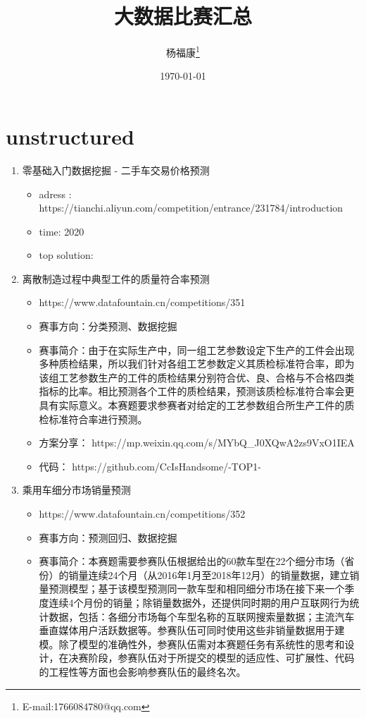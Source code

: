 \documentclass{article}
\title{大数据比赛汇总}
\author{杨福康\thanks{E-mail:1766084780@qq.com}}
\date{\today}
\begin{document}
	\maketitle
	\section{unstructured}
		\begin{enumerate}
			\item 零基础入门数据挖掘 - 二手车交易价格预测
				\begin{itemize}
					\item adress : https://tianchi.aliyun.com/competition/entrance/231784/introduction
					\item time: 2020
					\item top solution:
				\end{itemize} 
			\item 离散制造过程中典型工件的质量符合率预测
				\begin{itemize}
					\item https://www.datafountain.cn/competitions/351
					\item 赛事方向：分类预测、数据挖掘
					
					\item 	赛事简介：由于在实际生产中，同一组工艺参数设定下生产的工件会出现多种质检结果，所以我们针对各组工艺参数定义其质检标准符合率，即为该组工艺参数生产的工件的质检结果分别符合优、良、合格与不合格四类指标的比率。相比预测各个工件的质检结果，预测该质检标准符合率会更具有实际意义。本赛题要求参赛者对给定的工艺参数组合所生产工件的质检标准符合率进行预测。
					
					\item 方案分享： https://mp.weixin.qq.com/s/MYbQ\_J0XQwA2zs9VxO1IEA
					\item 代码： https://github.com/CcIsHandsome/-TOP1-
				\end{itemize} 
			\item 乘用车细分市场销量预测
				\begin{itemize}
					\item https://www.datafountain.cn/competitions/352
					\item 赛事方向：预测回归、数据挖掘
					
					\item 	赛事简介：本赛题需要参赛队伍根据给出的60款车型在22个细分市场（省份）的销量连续24个月（从2016年1月至2018年12月）的销量数据，建立销量预测模型；基于该模型预测同一款车型和相同细分市场在接下来一个季度连续4个月份的销量；除销量数据外，还提供同时期的用户互联网行为统计数据，包括：各细分市场每个车型名称的互联网搜索量数据；主流汽车垂直媒体用户活跃数据等。参赛队伍可同时使用这些非销量数据用于建模。除了模型的准确性外，参赛队伍需对本赛题任务有系统性的思考和设计，在决赛阶段，参赛队伍对于所提交的模型的适应性、可扩展性、代码的工程性等方面也会影响参赛队伍的最终名次。
					

\end{itemize}
\end{enumerate}
\end{document}
